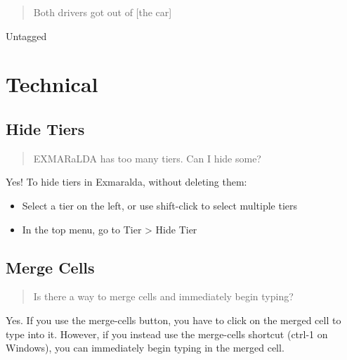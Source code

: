 \documentclass[
]{book}
\providecommand{\tightlist}{%
  \setlength{\itemsep}{0pt}\setlength{\parskip}{0pt}}
\begin{document}
\begin{quote}
Both drivers got out of {[}the car{]}
\end{quote}

Untagged

\hypertarget{technical}{%
\section{Technical}\label{technical}}

\hypertarget{hide-tiers}{%
\subsection{Hide Tiers}\label{hide-tiers}}

\begin{quote}
EXMARaLDA has too many tiers. Can I hide some?
\end{quote}

Yes! To hide tiers in Exmaralda, without deleting them:

\begin{itemize}
\tightlist
\item
  Select a tier on the left, or use shift-click to select multiple tiers
\item
  In the top menu, go to Tier \textgreater{} Hide Tier
\end{itemize}

\hypertarget{merge-cells}{%
\subsection{Merge Cells}\label{merge-cells}}

\begin{quote}
Is there a way to merge cells and immediately begin typing?
\end{quote}

Yes.
If you use the merge-cells button, you have to click on the merged cell to type into it.
However, if you instead use the merge-cells shortcut (ctrl-1 on Windows), you can immediately begin typing in the merged cell.
\end{document}
